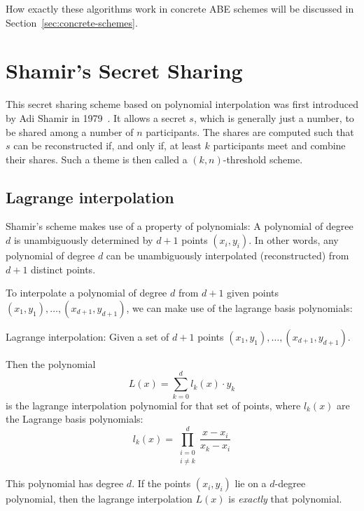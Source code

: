 How exactly these algorithms work in concrete ABE schemes will be discussed in Section~\ref{sec:concrete-schemes}.

\section{Shamir's Secret Sharing}
This secret sharing scheme based on polynomial interpolation was first introduced by Adi Shamir in 1979~\cite{shamir_how_1979}.
It allows a secret $s$, which is generally just a number, to be shared among a number of $n$ participants.
The shares are computed such that $s$ can be reconstructed if, and only if, at least $k$ participants meet and combine their shares.
Such a theme is then called a $(k,n)$-threshold scheme.~\cite{shamir_how_1979}

\subsection{Lagrange interpolation}
Shamir's scheme makes use of a property of polynomials: A polynomial of degree $d$ is unambiguously determined by $d+1$ points $(x_i, y_i)$.
In other words, any polynomial of degree $d$ can be unambiguously interpolated (reconstructed) from $d+1$ distinct points.

To interpolate a polynomial of degree $d$ from $d+1$ given points $(x_1, y_1), \dots, (x_{d+1}, y_{d+1})$, we can make use of the lagrange basis polynomials:~\cite{yao_lightweight_2015}

\begin{definition}
    Lagrange interpolation: Given a set of $d+1$ points $(x_1, y_1), \dots, (x_{d+1}, y_{d+1})$.

    Then the polynomial 
    \begin{equation}
        L(x) = \sum_{k=0}^d l_k(x) \cdot y_k
    \end{equation}
    is the lagrange interpolation polynomial for that set of points, where $l_k(x)$ are the Lagrange basis polynomials:
    \begin{equation}
        l_k(x) = \prod_{\substack{i=0\\ i \neq k}}^d \frac{x-x_i}{x_k-x_i}
    \end{equation}
\end{definition}

This polynomial has degree $d$. If the points $(x_i, y_i)$ lie on a $d$-degree polynomial, then the lagrange interpolation $L(x)$ is \emph{exactly} that polynomial.

